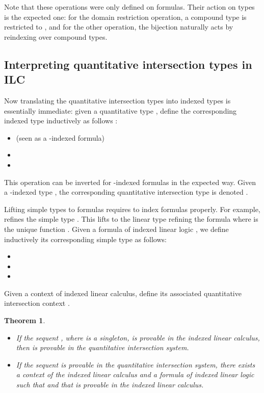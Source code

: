 \documentclass{eptcs}
\newtheorem{theorem}{Theorem}
\begin{document}
Note that these operations were only defined on formulas. Their action on types is the expected one: for the domain restriction operation, a compound type  is restricted to , and for the other operation, the bijection naturally acts by reindexing over compound types.

\subsection{Interpreting quantitative intersection types in ILC}

Now translating the quantitative intersection types into indexed types is essentially immediate: given a quantitative type , define the corresponding indexed type  inductively as follows :
\begin{itemize}
\item  (seen as a -indexed formula)
\item 
\item 
\end{itemize}
This operation can be inverted for -indexed formulas in the expected way.
Given a -indexed type , the corresponding quantitative intersection type is denoted .


 Lifting simple types to formulas requires to index formulas properly. For example,  refines the simple type . This lifts to the linear type  refining the formula  where  is the unique function . Given a formula of indexed linear logic , we define inductively its corresponding simple type  as follows:
\begin{itemize}
\item 
\item 
\item 
\end{itemize}

Given a context  of indexed linear calculus, define its associated quantitative intersection context .\\


\begin{theorem}\label{theorem/comparison}
\begin{itemize}
\item If the sequent , where  is a singleton, is provable in the indexed linear calculus, then  is provable in the quantitative intersection system.
\item  If the sequent  is provable in the quantitative intersection system, there exists a context  of the indexed linear calculus and a formula  of indexed linear logic such that  and that  is provable in the indexed linear calculus.
\end{itemize}
\end{theorem}
\end{document}
